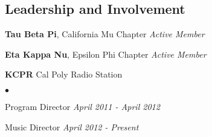\documentclass[margin,line]{res}
\newenvironment{list1}{
    \begin{list}{\ding{113}}{%
      \setlength{\itemsep}{0in}
        \setlength{\parsep}{0in} \setlength{\parskip}{0in}
        \setlength{\topsep}{0in} \setlength{\partopsep}{0in}
    \setlength{\leftmargin}{0.17in}}}{\end{list}}
\newenvironment{list2}{
      \begin{list}{$\bullet$}{%
        \setlength{\itemsep}{0in}
          \setlength{\parsep}{0in} \setlength{\parskip}{0in}
          \setlength{\topsep}{0in} \setlength{\partopsep}{0in}
      \setlength{\leftmargin}{0.2in}}}{\end{list}}
\begin{document}
\begin{resume}
        \section{\sc Leadership and Involvement}
        \begin{list1}
        \item[] {\bf Tau Beta Pi}, California Mu Chapter \hfill {\em Active Member}
        \item[] {\bf Eta Kappa Nu}, Epsilon Phi Chapter \hfill {\em Active Member}
        \item[] {\bf KCPR} Cal Poly Radio Station
          \begin{list2}
          \item[] Program Director \hfill {\em April 2011 - April 2012}
          \item[] Music Director \hfill {\em April 2012 - Present}
          \end{list2}
        \end{list1}


      \end{resume}
      
\end{document}
